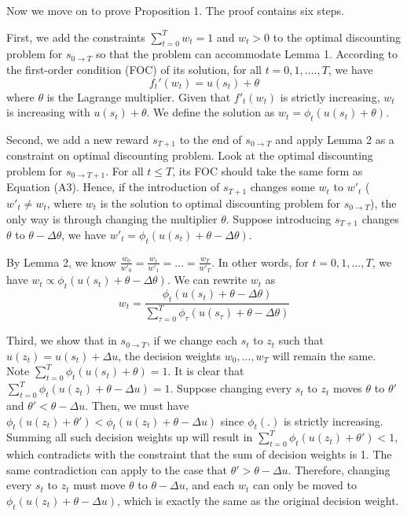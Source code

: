 \documentclass[
  12pt,
]{article}
\begin{document}
Now we move on to prove Proposition 1. The proof contains six steps.

First, we add the constraints \(\sum_{t=0}^T w_t=1\) and \(w_t>0\) to
the optimal discounting problem for \(s_{0\rightarrow T}\) so that the
problem can accommodate Lemma 1. According to the first-order condition
(FOC) of its solution, for all \(t=0,1,….,T\), we have\[\tag{A3}
f_t'(w_t)=u(s_t)+\theta
\]where \(\theta\) is the Lagrange multiplier. Given that \(f'_t(w_t)\)
is strictly increasing, \(w_t\) is increasing with \(u(s_t)+\theta\). We
define the solution as \(w_t =\phi_t(u(s_t)+\theta)\).

Second, we add a new reward \(s_{T+1}\) to the end of
\(s_{0\rightarrow T}\) and apply Lemma 2 as a constraint on optimal
discounting problem. Look at the optimal discounting problem for
\(s_{0\rightarrow T+1}\). For all \(t\leq T\), its FOC should take the
same form as Equation (A3). Hence, if the introduction of \(s_{T+1}\)
changes some \(w_t\) to \(w'_t\) (\(w'_t \neq w_t\), where \(w_t\) is
the solution to optimal discounting problem for \(s_{0\rightarrow T}\)),
the only way is through changing the multiplier \(\theta\). Suppose
introducing \(s_{T+1}\) changes \(\theta\) to \(\theta-\Delta \theta\),
we have \(w'_t = \phi_t(u(s_t)+\theta-\Delta \theta)\).

By Lemma 2, we know
\(\frac{w_0}{w'_0}=\frac{w_1}{w'_1}=…=\frac{w_T}{w'_T}\). In other
words, for \(t=0,1,…,T\), we have
\(w_t \propto \phi_t(u(s_t)+\theta-\Delta \theta)\). We can rewrite
\(w_t\) as \[\tag{A4}
w_t = \frac{\phi_t(u(s_t)+\theta-\Delta \theta)}{\sum_{\tau=0}^{T}\phi_\tau(u(s_\tau)+\theta-\Delta \theta)}
\]

Third, we show that in \(s_{0\rightarrow T}\), if we change each \(s_t\)
to \(z_t\) such that \(u(z_t)=u(s_t)+\Delta u\), the decision weights
\(w_0,…,w_T\) will remain the same. Note
\(\sum_{t=0}^T \phi_t(u(s_t)+\theta)=1\). It is clear that
\(\sum_{t=0}^T \phi_t(u(z_t)+\theta-\Delta u)=1\). Suppose changing
every \(s_t\) to \(z_t\) moves \(\theta\) to \(\theta'\) and
\(\theta'<\theta-\Delta u\). Then, we must have
\(\phi_t(u(z_t)+\theta')<\phi_t(u(z_t)+\theta-\Delta u)\) since
\(\phi_t(.)\) is strictly increasing. Summing all such decision weights
up will result in \(\sum_{t=0}^T \phi_t(u(z_t)+\theta')<1\), which
contradicts with the constraint that the sum of decision weights is 1.
The same contradiction can apply to the case that
\(\theta'>\theta-\Delta u\). Therefore, changing every \(s_t\) to
\(z_t\) must move \(\theta\) to \(\theta - \Delta u\), and each \(w_t\)
can only be moved to \(\phi_t(u(z_t)+\theta -\Delta u)\), which is
exactly the same as the original decision weight.
\end{document}
